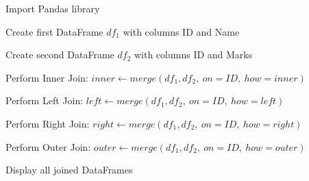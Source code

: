 \begin{algorithm}
\caption{Perform Inner, Left, Right, and Outer Joins on Two DataFrames}
\begin{algorithmic}[1]

\STATE Import Pandas library

\STATE Create first DataFrame $df_1$ with columns ID and Name

\STATE Create second DataFrame $df_2$ with columns ID and Marks

\STATE Perform Inner Join:
\STATE $inner \gets merge(df_1, df_2,\ on=ID,\ how=inner)$

\STATE Perform Left Join:
\STATE $left \gets merge(df_1, df_2,\ on=ID,\ how=left)$

\STATE Perform Right Join:
\STATE $right \gets merge(df_1, df_2,\ on=ID,\ how=right)$

\STATE Perform Outer Join:
\STATE $outer \gets merge(df_1, df_2,\ on=ID,\ how=outer)$

\STATE Display all joined DataFrames

\end{algorithmic}
\end{algorithm}